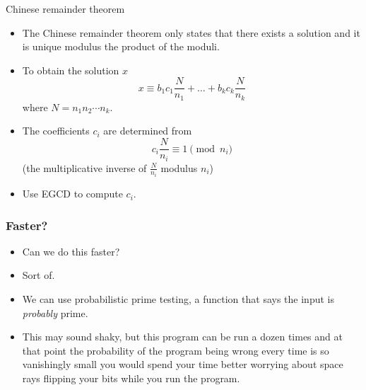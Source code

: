 \documentclass{beamer}
\begin{document}
\begin{frame}[plain]{Chinese remainder theorem}
  \vspace{10pt}
  \begin{itemize}
    \item The Chinese remainder theorem only states that there exists a solution and it
  is unique modulus the product of the moduli. \\
    \item To obtain the solution $x$
      \[
        x \equiv b_1 c_1 \frac{N}{n_1} + \ldots + b_k c_k \frac{N}{n_k}
      \]
      where $N = n_1 n_2 \cdots n_k$.
    \item The coefficients $c_i$ are determined from
      \[
        c_i \frac{N}{n_i} \equiv 1 \pmod{n_i}
      \]
      (the multiplicative inverse of $\frac{N}{n_i}$ modulus $n_i$)
    \item Use EGCD to compute $c_i$.
  \end{itemize}
\end{frame}



\begin{frame}[plain]
\frametitle{Faster?}

\begin{itemize}
    \item Can we do this faster?
    \item Sort of.
    \item We can use probabilistic prime testing, a function that says the input is \textit{probably} prime.
    \item This may sound shaky, but this program can be run a dozen times and at that point the probability of the program being wrong every
        time is so vanishingly small you would spend your time better worrying about space rays flipping your bits while you run the program.
\end{itemize}

\end{frame}
\end{document}
